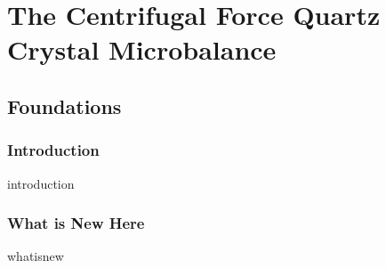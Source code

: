 \documentclass[a4paper,titlepage,onecolumn]{report}
\begin{document}

\part{The Centrifugal Force Quartz Crystal Microbalance}
\chapter{Foundations}
	\section{Introduction}
	{introduction}
	\section{What is New Here}
	{whatisnew}
\end{document}
